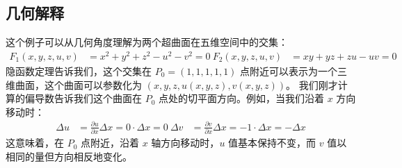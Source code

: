 \documentclass{ctexart}  %
\begin{document}
\subsection {几何解释}
这个例子可以从几何角度理解为两个超曲面在五维空间中的交集：
\begin {align}
F_1 (x, y, z, u, v) &= x^2 + y^2 + z^2 - u^2 - v^2 = 0\
F_2 (x, y, z, u, v) &= xy + yz + zu - uv = 0
\end {align}
隐函数定理告诉我们，这个交集在 \(P_0 = (1, 1, 1, 1, 1)\) 点附近可以表示为一个三维曲面，这个曲面可以参数化为 \((x, y, z, u(x, y, z), v(x, y, z))\)。
我们刚才计算的偏导数告诉我们这个曲面在 \(P_0\) 点处的切平面方向。例如，当我们沿着 \(x\) 方向移动时：
\begin {align}
\Delta u &= \frac {\partial u}{\partial x} \Delta x = 0 \cdot \Delta x = 0\
\Delta v &= \frac {\partial v}{\partial x} \Delta x = -1 \cdot \Delta x = -\Delta x
\end {align}
这意味着，在 \(P_0\) 点附近，沿着 \(x\) 轴方向移动时，\(u\) 值基本保持不变，而 \(v\) 值以相同的量但方向相反地变化。
\end{document}

